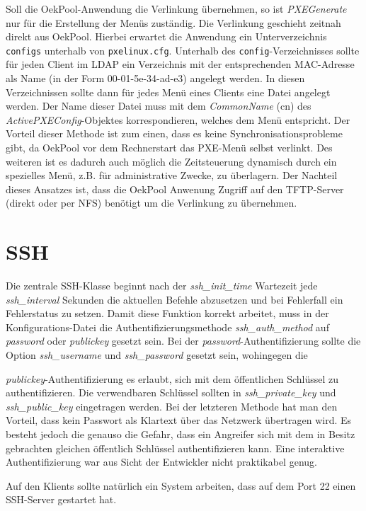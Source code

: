 \documentclass[	
				a4paper, 
				twoside,
				11pt,
				DIV11,
				BCOR12mm,
				bibtotoc, 
				halfparskip, 
				headsepline, 
				pointlessnumbers]{scrartcl}
\begin{document}
Soll die OekPool-Anwendung die Verlinkung übernehmen, so ist \textit{PXEGenerate} nur für die Erstellung der Menüs zuständig.
Die Verlinkung geschieht zeitnah direkt aus OekPool. Hierbei erwartet die Anwendung ein Unterverzeichnis \verb+configs+ unterhalb von \verb+pxelinux.cfg+.
Unterhalb des \verb+config+-Verzeichnisses sollte für jeden Client im LDAP ein Verzeichnis mit der entsprechenden MAC-Adresse als Name (in der Form 00-01-5e-34-ad-e3) angelegt werden.
In diesen Verzeichnissen sollte dann für jedes Menü eines Clients eine Datei angelegt werden. Der Name dieser Datei muss mit dem \textit{CommonName} (cn) des \textit{ActivePXEConfig}-Objektes korrespondieren, welches dem Menü entspricht.
Der Vorteil dieser Methode ist zum einen, dass es keine Synchronisationsprobleme gibt, da OekPool vor dem Rechnerstart das PXE-Menü selbst verlinkt.
Des weiteren ist es dadurch auch möglich die Zeitsteuerung dynamisch durch ein spezielles Menü, z.B. für administrative Zwecke, zu überlagern.
Der Nachteil dieses Ansatzes ist, dass die OekPool Anwenung Zugriff auf den TFTP-Server (direkt oder per NFS) benötigt um die Verlinkung zu übernehmen.


\section{SSH}
Die zentrale SSH-Klasse beginnt nach der \textit{ssh\_init\_time} Wartezeit jede \textit{ssh\_interval} Sekunden die aktuellen Befehle abzusetzen und bei Fehlerfall ein Fehlerstatus zu setzen. Damit diese Funktion korrekt arbeitet, muss in der Konfigurations-Datei die Authentifizierungsmethode \textit{ssh\_auth\_method} auf \textit{password} oder \textit{publickey} gesetzt sein. 
Bei der \textit{password}-Authentifizierung sollte die Option \textit{ssh\_username} und \textit{ssh\_password} gesetzt sein, wohingegen die 

\textit{publickey}-Authentifizierung es erlaubt, sich mit dem öffentlichen Schlüssel zu authentifizieren. Die verwendbaren Schlüssel sollten in \textit{ssh\_private\_key} und \textit{ssh\_public\_key} eingetragen werden. Bei der letzteren Methode hat man den Vorteil, dass kein Passwort als Klartext über das Netzwerk übertragen wird. Es besteht jedoch die genauso die Gefahr, dass ein Angreifer sich mit dem in Besitz gebrachten gleichen öffentlich Schlüssel authentifizieren kann. Eine interaktive Authentifizierung war aus Sicht der Entwickler nicht praktikabel genug.

Auf den Klients sollte natürlich ein System arbeiten, dass auf dem Port 22 einen SSH-Server gestartet hat.
\end{document}
